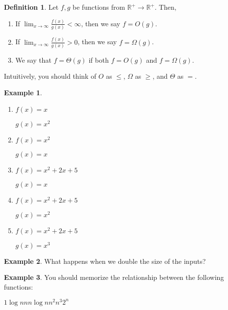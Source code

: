 \documentclass[10pt]{article}
\theoremstyle{definition}
\newtheorem{example}{Example}
\newtheorem{defn}{Definition}
\newcommand{\R}{\mathbb R}
\begin{document}
\newpage
\begin{defn}
    Let $f,g$ be functions from $\R^+\to\R^+$.
    Then,
    \begin{enumerate}
        \item If $\displaystyle\lim_{x\to\infty} \frac{f(x)}{g(x)} < \infty$, then we say $f = O(g)$.
        \item If $\displaystyle\lim_{x\to\infty} \frac{f(x)}{g(x)} > 0$, then we say $f = \Omega(g)$.
        \item We say that $f = \Theta(g)$ if both $f=O(g)$ and $f=\Omega(g)$.
    \end{enumerate}
    Intuitively, you should think of $O$ as $\le$, $\Omega$ as $\ge$, and $\Theta$ as $=$.
\end{defn}

\begin{example}~
    \begin{enumerate}
        \item 
            $f(x) = x$
            
            $g(x) = x^2$
            \vspace{1in}
        \item
            $f(x) = x^2$
            
            $g(x) = x$
            \vspace{1in}
        \item
            $f(x) = x^2 + 2x + 5$
            
            $g(x) = x$
            \vspace{1in}
        \item
            $f(x) = x^2 + 2x + 5$
            
            $g(x) = x^2$
            \vspace{1in}
        \item
            $f(x) = x^2 + 2x + 5$
            
            $g(x) = x^3$
    \end{enumerate}
\end{example}

\newpage
\begin{example}
    What happens when we double the size of the inputs?
\end{example}

\newpage
\begin{example}
    You should memorize the relationship between the following functions:
        
        \vspace{0.15in}
        \begin{center}
        $1$\qquad \qquad $\log n$\qquad \qquad  $n$\qquad \qquad  $n\log n$\qquad \qquad  $n^2$\qquad \qquad  $n^3$\qquad \qquad  $2^n$
        \end{center}
        \vspace{0.15in}
\end{example}
\end{document}
